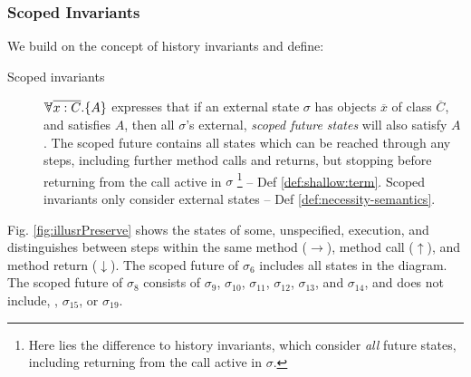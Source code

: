 \subsubsection{Scoped Invariants}

\label{sect:approach:scoped}
We build on the concept of history invariants \cite{liskov94behavioral,usinghistory,Cohen10} and define:

\begin{description}
\item[{Scoped invariants}]  
{$\TwoStatesN  {\overline{x:C}}  {A}$} expresses that if an external {state} $\sigma$ 
 has objects $\overline x$ of class $\overline C$, and satisfies $A$, then all $\sigma$'s  {external}, \emph{scoped  future  states}   will  {also} satisfy  {$A$}. 
The scoped future contains all  states which can be reached through any steps, including further method calls and returns, but stopping before returning  from the call active in $\sigma$ \footnote{{Here lies the difference to history invariants, which consider \emph{all} future states, including returning from the call active in $\sigma$.}}  --  \cf Def  \ref{def:shallow:term}.
Scoped invariants only consider external states -- \cf Def \ref{def:necessity-semantics}.
\end{description}

 Fig. \ref{fig:illusrPreserve} shows the  states of some, unspecified, execution,   and distinguishes between steps within the same method ($\rightarrow$),
method call ($\uparrow$), and method return ($\downarrow$). %
The scoped future of $\sigma_6$ includes all states in the diagram. The scoped future of $\sigma_8$ consists of $\sigma_9$, $\sigma_{10}$,  $\sigma_{11}$,  
$\sigma_{12}$,   $\sigma_{13}$,  and $\sigma_{14}$, and does not include, \eg,  $\sigma_{15}$, or $\sigma_{19}$.
 
